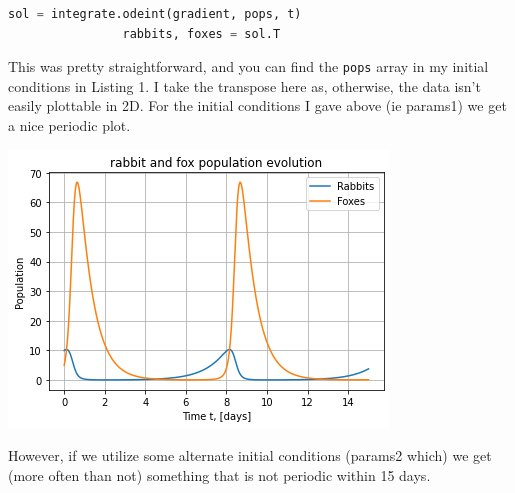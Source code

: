 \documentclass[11pt]{article}
\begin{document}
\begin{enumerate}
            \begin{lstlisting}[style=mystyle, linewidth=0.94\linewidth, 
                                language=Python, gobble=8, caption=scipy integrate]
                sol = integrate.odeint(gradient, pops, t)
                rabbits, foxes = sol.T
            \end{lstlisting}

            This was pretty straightforward, and you can find the \texttt{pops}
            array in my initial conditions in Listing 1. I take the transpose
            here as, otherwise, the data isn't easily plottable in 2D. For the
            initial conditions I gave above (ie params1) we get a nice periodic
            plot. 
            \begin{center}
                \includegraphics[width=.5\linewidth]{output.png}
            \end{center}
            However, if we utilize some alternate initial conditions (params2
            which) we get (more often than not) something that is not periodic 
            within 15 days. 


\end{enumerate}
\end{document}
